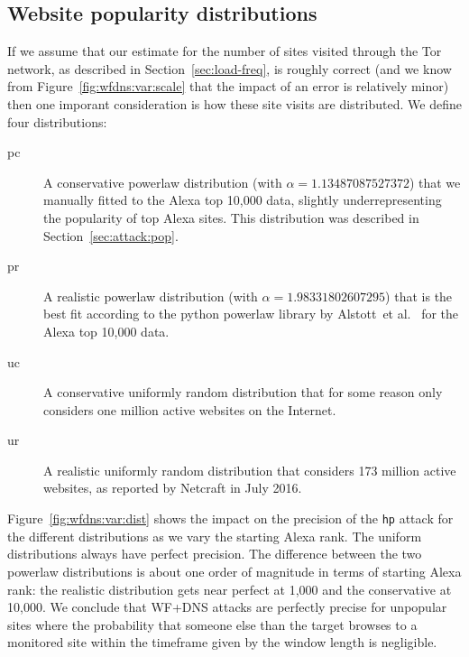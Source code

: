 \subsection{Website popularity distributions}
If we assume that our estimate for the number of sites visited through the Tor
network, as described in Section~\ref{sec:load-freq}, is roughly correct
(and we know from Figure~\ref{fig:wfdns:var:scale} that the impact of an error
is relatively minor) then one imporant consideration is how
these site visits are distributed. We define four distributions:
\begin{description}
	\item[pc] A conservative powerlaw distribution
	(with $\alpha=1.13487087527372$)
	that we manually fitted to the Alexa top 10,000 data,
	slightly underrepresenting the popularity of top Alexa sites.
	This distribution was described in Section~\ref{sec:attack:pop}.
	\item[pr] A realistic powerlaw distribution
	(with $\alpha=1.98331802607295$)
	that is the best fit according to
	the python powerlaw library by Alstott~et al.~\cite{powerlaw} for the Alexa
	top 10,000 data.
	\item[uc] A conservative uniformly random distribution that for some reason
	only considers one million active websites on the Internet.
	\item[ur] A realistic uniformly random distribution that considers 173 million active websites, as reported by Netcraft in July 2016.
\end{description}
Figure~\ref{fig:wfdns:var:dist} shows the impact on the precision of the
\texttt{hp} attack for the different distributions as we vary the starting
Alexa rank. The uniform distributions always have perfect precision.
The difference between the two powerlaw distributions is about one order of
magnitude in terms of starting Alexa rank: the realistic distribution gets
near perfect at 1,000 and the conservative at 10,000.
We conclude that WF+DNS attacks are perfectly precise for unpopular sites
where the probability that someone else than the target browses to a monitored
site within the timeframe given by the window length is negligible.

